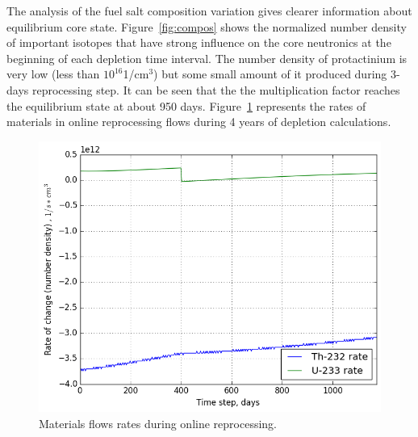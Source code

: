 \documentclass{anstrans}
\begin{document}
The analysis of the fuel salt composition variation gives clearer information about equilibrium core state. Figure~\ref{fig:compos} shows the normalized number density of important isotopes that have strong influence on the core neutronics at the beginning of each depletion time interval. The number density of protactinium is very low (less than $10^{16}$1/cm$^3$) but some small amount of it produced during 3-days reprocessing step. It can be seen that the the multiplication factor reaches the equilibrium state at about 950  days. Figure~\ref{fig:rates} represents the rates of materials in online reprocessing flows during 4 years of depletion calculations. 
\begin{figure}[hb] %
  \centering
  \vspace{-0.8em}
  \includegraphics[width=1.03\linewidth]{rates_fuel.png}
  \caption{Materials flows rates during online reprocessing.}
  \label{fig:rates}
  \vspace{-0.8em}
\end{figure}
\end{document}
